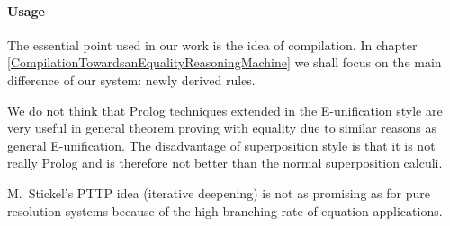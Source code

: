 \paragraph{Usage}
The essential point used in our work is the idea of compilation. In chapter
\ref{CompilationTowardsanEqualityReasoningMachine}
we shall focus on the main difference of our system: newly
derived rules.

We do not think that Prolog techniques extended in the E-unification style
are very useful in general theorem proving with equality due to similar
reasons as general E-unification. The disadvantage
of superposition style is that it is not really Prolog and is therefore 
not better than the normal superposition calculi.


M.\ Stickel's PTTP idea \cite{Stickel86} (iterative deepening)
is not as promising as for 
pure resolution systems because of the high branching 
rate of equation applications.
